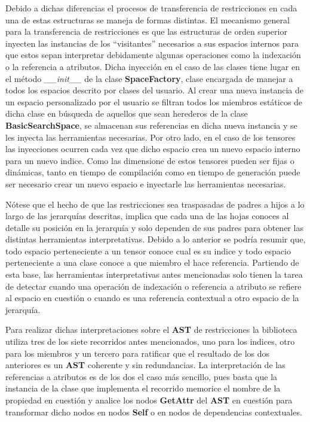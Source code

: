Debido a dichas diferencias el procesos de transferencia de restricciones en cada una de estas estructuras se maneja de formas
distintas. El mecanismo general para la transferencia de restricciones es que las estructuras de orden superior inyecten las
instancias de los ``visitantes'' necesarios a sus espacios internos para que estos sepan interpretar debidamente algunas operaciones
como la indexación o la referencia a atributos. Dicha inyección en el caso de las clases tiene lugar en el método \newline
{\it \_\_init\_\_} de la clase {\bf SpaceFactory}, clase encargada de manejar a todos los espacios descrito por clases del usuario. Al crear una nueva instancia
de un espacio personalizado por el usuario se filtran todos los miembros estáticos de dicha clase en búsqueda de aquellos que sean
herederos de la clase {\bf BasicSearchSpace}, se almacenan sus referencias en dicha nueva instancia y se les inyecta las herramientas
necesarias. Por otro lado, en el caso de los tensores las inyecciones ocurren cada vez que dicho espacio crea un nuevo espacio
interno para un nuevo indice. Como las dimensione de estos tensores pueden ser fijas o dinámicas, tanto en tiempo de compilación
como en tiempo de generación puede ser necesario crear un nuevo espacio e inyectarle las herramientas necesarias.

Nótese que el hecho de que las restricciones sea traspasadas de padres a hijos a lo largo de las jerarquías descritas, implica que
cada una de las hojas conoces al detalle su posición en la jerarquía y solo dependen de sus padres para obtener las distintas
herramientas interpretativas. Debido a lo anterior se podría resumir que, todo espacio perteneciente a un tensor conoce cual es
su indice y todo espacio perteneciente a una clase conoce a que miembro el hace referencia. Partiendo de esta base, las herramientas
interpretativas antes mencionadas solo tienen la tarea de detectar cuando una operación de indexación o referencia a atributo se refiere
al espacio en cuestión o cuando es una referencia contextual a otro espacio de la jerarquía.

Para realizar dichas interpretaciones sobre el {\bf AST} de restricciones la biblioteca utiliza tres de los siete recorridos antes mencionados,
uno para los indices, otro para los miembros y un tercero para ratificar que el resultado de los dos anteriores es un {\bf AST} coherente y sin
redundancias. La interpretación de las referencias a atributos es de los dos el caso más sencillo, pues basta que la instancia de la
clase que implementa el recorrido memorice el nombre de la propiedad en cuestión y analice los nodos {\bf GetAttr} del {\bf AST} en cuestión
para transformar dicho nodos en nodos {\bf Self} o en nodos de dependencias contextuales.

